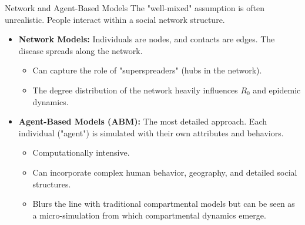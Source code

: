 \documentclass[aspectratio=169]{beamer}\usepackage[]{graphicx}\usepackage[]{xcolor}
\begin{document}
\begin{frame}{Network and Agent-Based Models}
    The "well-mixed" assumption is often unrealistic. People interact within a social network structure.
    \begin{itemize}
        \item \textbf{Network Models:} Individuals are nodes, and contacts are edges. The disease spreads along the network.
        \begin{itemize}
            \item Can capture the role of "superspreaders" (hubs in the network).
            \item The degree distribution of the network heavily influences $R_0$ and epidemic dynamics.
        \end{itemize}
        \item \textbf{Agent-Based Models (ABM):} The most detailed approach. Each individual ("agent") is simulated with their own attributes and behaviors.
        \begin{itemize}
            \item Computationally intensive.
            \item Can incorporate complex human behavior, geography, and detailed social structures.
            \item Blurs the line with traditional compartmental models but can be seen as a micro-simulation from which compartmental dynamics emerge.
        \end{itemize}
    \end{itemize}
\end{frame}
\end{document}
